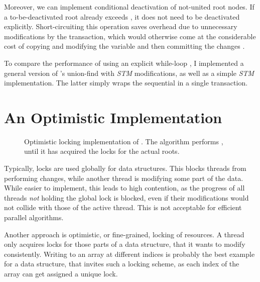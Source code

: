 Moreover, we can implement conditional deactivation of not-united root nodes. If
a to-be-deactivated root already exceeds , it does not need
to be deactivated explicitly. Short-circuiting this operation saves overhead due
to unnecessary modifications by the transaction, which would otherwise come at
the considerable cost of copying and modifying the variable and then committing
the changes \cite{Herlihy2008Art}.

To compare the performance of using an explicit while-loop , I implemented a
general version of \citeauthor{Anderson1994Waitfree}'s union-find with
\emph{STM} modifications, as well as a simple \emph{STM} implementation. The
latter simply wraps the sequential  in a single transaction.

\section{An Optimistic Implementation}
\label{sec:union-find-optimistic}

\begin{figure}

  

  \caption[Optimistic locking implementation of .]{Optimistic
    locking implementation of . The algorithm performs
    , until it has acquired the locks for the actual roots.}
  \label{fig:union-find-optimistic-union}
\end{figure}

Typically, locks are used globally for data structures. This blocks threads from
performing changes, while another thread is modifying some part of the
data. While easier to implement, this leads to high contention, as the progress
of all threads \emph{not} holding the global lock is blocked, even if their
modifications would not collide with those of the active thread. This is not
acceptable for efficient parallel algorithms.

Another approach is optimistic, or fine-grained, locking of resources. A thread
only acquires locks for those parts of a data structure, that it wants to modify
consistently. Writing to an array at different indices is probably the best
example for a data structure, that invites such a locking scheme, as each index
of the array can get assigned a unique lock.

